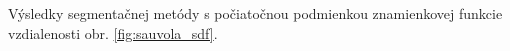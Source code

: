 \documentclass[a4paper,11pt,oneside]{article}%
\begin{document}
Výsledky segmentačnej metódy s počiatočnou podmienkou znamienkovej funkcie vzdialenosti obr. \ref{fig:sauvola_sdf}.

\begin{figure}[H]  
    \hspace{5px}

\end{figure}
\end{document}
